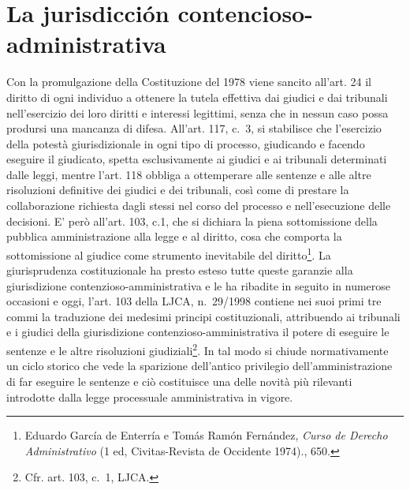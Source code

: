 \documentclass[12pt,it,a4paper,]{report}
\begin{document}
\hypertarget{la-jurisdicciuxf3n-contencioso-administrativa}{%
\section{La jurisdicción
contencioso-administrativa}\label{la-jurisdicciuxf3n-contencioso-administrativa}}

Con la promulgazione della Costituzione del 1978 viene sancito all'art.
24 il diritto di ogni individuo a ottenere la tutela effettiva dai
giudici e dai tribunali nell'esercizio dei loro diritti e interessi
legittimi, senza che in nessun caso possa prodursi una mancanza di
difesa. All'art. 117, c.~3, si stabilisce che l'esercizio della potestà
giurisdizionale in ogni tipo di processo, giudicando e facendo eseguire
il giudicato, spetta esclusivamente ai giudici e ai tribunali
determinati dalle leggi, mentre l'art. 118 obbliga a ottemperare alle
sentenze e alle altre risoluzioni definitive dei giudici e dei
tribunali, così come di prestare la collaborazione richiesta dagli
stessi nel corso del processo e nell'esecuzione delle decisioni. E' però
all'art. 103, c.1, che si dichiara la piena sottomissione della pubblica
amministrazione alla legge e al diritto, cosa che comporta la
sottomissione al giudice come strumento inevitabile del
diritto\footnote{{Eduardo García de Enterría e Tomás Ramón Fernández,
  \emph{Curso de Derecho Administrativo} (1 ed, {Civitas-Revista de
  Occidente} 1974).}, 650.}. La giurisprudenza costituzionale ha presto
esteso tutte queste garanzie alla giurisdizione
contenzioso-amministrativa e le ha ribadite in seguito in numerose
occasioni e oggi, l'art. 103 della LJCA, n.~29/1998 contiene nei suoi
primi tre commi la traduzione dei medesimi principi costituzionali,
attribuendo ai tribunali e i giudici della giurisdizione
contenzioso-amministrativa il potere di eseguire le sentenze e le altre
risoluzioni giudiziali\footnote{Cfr. art. 103, c.~1, LJCA.}. In tal modo
si chiude normativamente un ciclo storico che vede la sparizione
dell'antico privilegio dell'amministrazione di far eseguire le sentenze
e ciò costituisce una delle novità più rilevanti introdotte dalla legge
processuale amministrativa in vigore.
\end{document}
